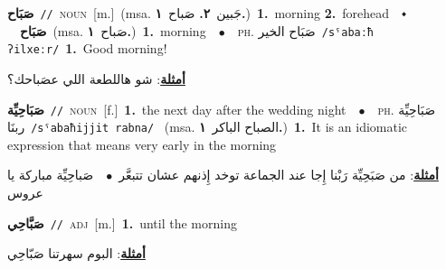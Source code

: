 \documentclass[10pt,a4paper,twoside]{article} %
\begin{document}
\begin{multicols}{2}
{\setlength\topsep{0pt}\textbf{\foreignlanguage{arabic}{صَبَاح}}\ {\color{gray}\texttt{//}\color{black}}\ \textsc{noun}\ [m.]\ \color{gray}(msa. \foreignlanguage{arabic}{جَبين}~\foreignlanguage{arabic}{\textbf{٢.}}  \foreignlanguage{arabic}{صَباح}~\foreignlanguage{arabic}{\textbf{١.}})\color{black}\ \textbf{1.}~morning  \textbf{2.}~forehead\ \ $\smblkdiamond$\ \ \setlength\topsep{0pt}\textbf{\foreignlanguage{arabic}{صَبَاح}}\ \color{gray}(msa. \foreignlanguage{arabic}{صَباح}~\foreignlanguage{arabic}{\textbf{١.}})\color{black}\ \textbf{1.}~morning\ \ $\bullet$\ \ \textsc{ph.} \color{gray} \foreignlanguage{arabic}{صَبَاح الخير}\color{black}\ {\color{gray}\texttt{/{\sffamily sˤabaːħ ʔilxeːr}/}\color{black}}\ \textbf{1.}~Good morning!\  \begin{flushright}\color{gray}\foreignlanguage{arabic}{\textbf{\underline{\foreignlanguage{arabic}{أمثلة}}}: شو هاللطعة اللي عصَباحك؟}\end{flushright}\color{black}} \vspace{2mm}

{\setlength\topsep{0pt}\textbf{\foreignlanguage{arabic}{صَبَاحِيِّة}}\ {\color{gray}\texttt{//}\color{black}}\ \textsc{noun}\ [f.]\ \textbf{1.}~the next day after the wedding night\ \ $\bullet$\ \ \textsc{ph.} \color{gray} \foreignlanguage{arabic}{صَبَاحِيِّة ربنَا}\color{black}\ {\color{gray}\texttt{/{\sffamily sˤabaħijjit rabna}/}\color{black}}\ \color{gray} (msa. \foreignlanguage{arabic}{الصباح الباكر}~\foreignlanguage{arabic}{\textbf{١.}})\color{black}\ \textbf{1.}~It is an idiomatic expression that means very early in the morning\  \begin{flushright}\color{gray}\foreignlanguage{arabic}{\textbf{\underline{\foreignlanguage{arabic}{أمثلة}}}: من صَبَحِيِّة رَبْنا إِجا عند الجماعة توخد إِذنهم عشان تتبعَّر\ $\bullet$\ \  صَباحِيِّة مباركة يا عروس}\end{flushright}\color{black}} \vspace{2mm}

{\setlength\topsep{0pt}\textbf{\foreignlanguage{arabic}{صَبَّاحِي}}\ {\color{gray}\texttt{//}\color{black}}\ \textsc{adj}\ [m.]\ \textbf{1.}~until the morning\  \begin{flushright}\color{gray}\foreignlanguage{arabic}{\textbf{\underline{\foreignlanguage{arabic}{أمثلة}}}: البوم سهرتنا صَبّاحِي}\end{flushright}\color{black}} \vspace{2mm}


\end{multicols}
\end{document}

